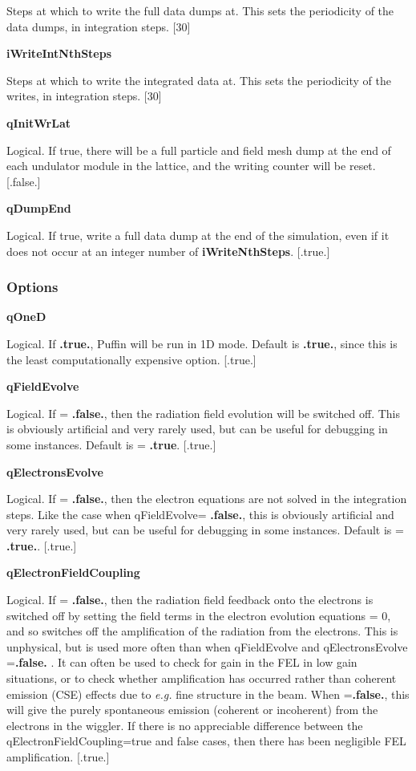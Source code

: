 \documentclass[12pt]{article}%
\begin{document}
Steps at which to write the full data dumps at. This sets the periodicity of the data dumps, in integration steps. [$30$]

{\bf iWriteIntNthSteps}

Steps at which to write the integrated data at. This sets the periodicity of the writes, in integration steps. [$30$]

{\bf qInitWrLat}

Logical. If true, there will be a full particle and field mesh dump at the end of each undulator module in the lattice, and the writing counter will be reset. [.false.]

{\bf qDumpEnd}

Logical. If true, write a full data dump at the end of the simulation, even if it does not occur at an integer number of {\bf iWriteNthSteps}. [.true.]




\subsubsection{Options}

{\bf qOneD}

Logical. If  {\bf .true.}, Puffin will be run in 1D mode. Default is  {\bf .true.}, since this is the least computationally expensive option. [.true.]

{\bf qFieldEvolve}

Logical. If = {\bf .false.}, then the radiation field evolution will be switched off. This is obviously artificial and very rarely used, but can be useful for debugging in some instances. Default is = {\bf .true}. [.true.]

{\bf qElectronsEvolve}

Logical. If = {\bf .false.}, then the electron equations are not solved in the integration steps. Like the case when qFieldEvolve= {\bf .false.},  this is obviously artificial and very rarely used, but can be useful for debugging in some instances. Default is = {\bf .true.}. [.true.]

{\bf qElectronFieldCoupling}

Logical. If = {\bf .false.}, then the radiation field feedback onto the electrons is switched off by setting the field terms in the electron evolution equations = 0, and so switches off the amplification of the radiation from the electrons. This is unphysical, but is used more often than when qFieldEvolve and qElectronsEvolve ={\bf .false.} . It can often be used to check for gain in the FEL in low gain situations, or to check whether amplification has occurred rather than coherent emission (CSE) effects due to \textit{e.g.} fine structure in the beam. When ={\bf .false.}, this will give the purely spontaneous emission (coherent or incoherent) from the electrons in the wiggler. If there is no appreciable difference between the qElectronFieldCoupling=true and false cases, then there has been negligible FEL amplification. [.true.]
\end{document}
